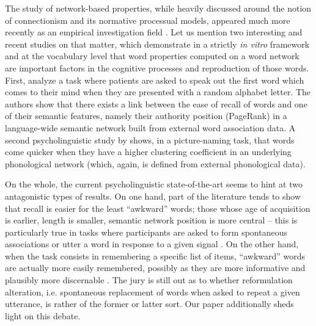 The study of network-based properties, while heavily discussed around the notion of connectionism and its normative processual models, appeared much more recently as an empirical investigation field \CN. Let us mention two interesting and recent studies on that matter, which demonstrate in a strictly \emph{in vitro} framework and at the vocabulary level that word properties computed on a word network are important factors in the cognitive processes and reproduction of those words. %
First, \citet{Griffiths07} analyze a task where patients are asked to speak out the first word which comes to their mind when they are presented with a random alphabet letter. The authors show that there exists a link between the ease of recall of words and one of their semantic features, namely their authority position (PageRank) in a language-wide semantic network built from external word association data. %
A second psycholinguistic study by \citet{Chan10} shows, in a picture-naming task, that words come quicker when they have a higher clustering coefficient in an underlying phonological network (which, again, is  defined from external phonological data). %

On the whole, the current psycholinguistic state-of-the-art seems to hint at two antagonistic types of results.  On one hand, part of the literature tends to show that recall is easier for the least ``awkward'' words; those whose age of acquisition is earlier, length is smaller, semantic network position is more central -- this is particularly true in tasks where participants are asked to form spontaneous associations or utter a word in response to a given signal \CN. On the other hand, when the task consists in remembering a specific list of items, ``awkward'' words are actually more easily remembered, possibly as they are more informative and plausibly more discernable \CN. The jury is still out as to whether reformulation alteration, i.e. spontaneous replacement of words when asked to repeat a given utterance, is rather of the former or latter sort.  Our paper additionally sheds light on this debate.

